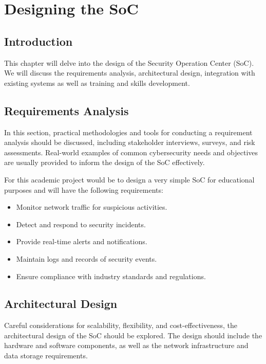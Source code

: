 \chapter{Designing the SoC}
\minitoc
\newpage

\setcounter{secnumdepth}{0} %
\section{Introduction}
This chapter will delve into the design of the Security Operation Center (SoC).
We will discuss the requirements analysis, architectural design, integration with existing systems as well as training and skills development.

\setcounter{secnumdepth}{2} %
\section{Requirements Analysis}
In this section, practical methodologies and tools for conducting a requirement analysis should be discussed, including stakeholder interviews, surveys, and risk assessments.
Real-world examples of common cybersecurity needs and objectives are usually provided to inform the design of the SoC effectively.

For this academic project would be to design a very simple SoC for educational purposes and will have the following requirements:
\begin{itemize}
    \item Monitor network traffic for suspicious activities.
    \item Detect and respond to security incidents.
    \item Provide real-time alerts and notifications.
    \item Maintain logs and records of security events.
    \item Ensure compliance with industry standards and regulations.
\end{itemize}

\section{Architectural Design}
Careful considerations for scalability, flexibility, and cost-effectiveness, the architectural design of the SoC should be explored.
The design should include the hardware and software components, as well as the network infrastructure and data storage requirements.

